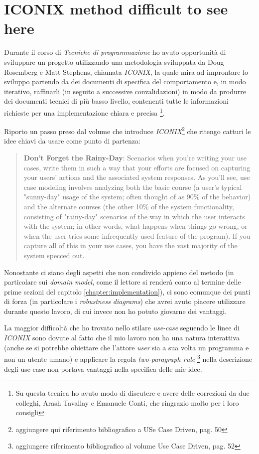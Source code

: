 \section{ICONIX method difficult to see here}
Durante il corso di \emph{Tecniche di programmazione} ho avuto
opportunit\`a di sviluppare un progetto utilizzando una metodologia
sviluppata da Doug Rosemberg e Matt Stephens, chiamata \emph{ICONIX},
la quale mira ad improntare lo sviluppo partendo da dei documenti di
specifica del comportamento e, in modo iterativo, raffinarli (in
seguito a successive convalidazioni) in modo da produrre dei documenti
tecnici di pi\`u basso livello, contenenti tutte le informazioni
richieste per una implementazione chiara e precisa \footnote{Su questa
  tecnica ho avuto modo di discutere e avere delle correzioni da due
  colleghi, Arash Tavallay e Emanuele Conti, che ringrazio molto per i
  loro consigli}.

Riporto un passo preso dal volume che introduce
\emph{ICONIX}\footnote{aggiungere qui riferimento bibliografico a USe
  Case Driven, pag. 50} che ritengo catturi le idee chiavi da usare
come punto di partenza:
\begin{quotation}
  \textbf{Don't Forget the Rainy-Day}: Scenarios when you're writing
  your use cases, write them in such a way that your efforts are
  focused on capturing your users' actions and the associated system
  responses. As you'll see, use case modeling involves analyzing both
  the basic course (a user's typical "sunny-day" usage of the system;
  often thought of as 90\% of the behavior) and the alternate courses
  (the other 10\% of the system functionality, consisting of
  "rainy-day" scenarios of the way in which the user interacts with
  the system; in other words, what happens when things go wrong, or
  when the user tries some infrequently used feature of the
  program). If you capture all of this in your use cases, you have the
  vast majority of the system specced out.
\end{quotation}

Nonostante ci siano degli aspetti che non condivido appieno del metodo
(in particolare sui \emph{domain model}, come il lettore si render\`a
conto al termine delle prime sezioni del capitolo
\ref{chapter:implementation}), ci sono comunque dei punti di forza (in
particolare i \emph{robustness diagrams}) che avrei avuto piacere
utilizzare durante questo lavoro, di cui invece non ho potuto giovarne
dei vantaggi.

La maggior difficolt\`a che ho trovato nello stilare \emph{use-case}
seguendo le linee di \emph{ICONIX} sono dovute al fatto che il mio
lavoro non ha una natura interattiva (anche se si potrebbe obiettare
che l'attore \emph{user} sia a sua volta un programma e non un utente
umano) e applicare la regola \emph{two-paragraph rule}
\footnote{aggiungere riferimento bibliografico al volume Use Case
  Driven, pag. 52} nella descrizione degli use-case non portava
vantaggi nella specifica delle mie idee.

